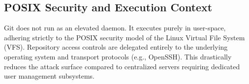 \subsection{POSIX Security and Execution Context}
Git does not run as an elevated daemon. It executes purely in user-space, adhering strictly to the POSIX security model of the Linux Virtual File System (VFS). Repository access controls are delegated entirely to the underlying operating system and transport protocols (e.g., OpenSSH). This drastically reduces the attack surface compared to centralized servers requiring dedicated user management subsystems.